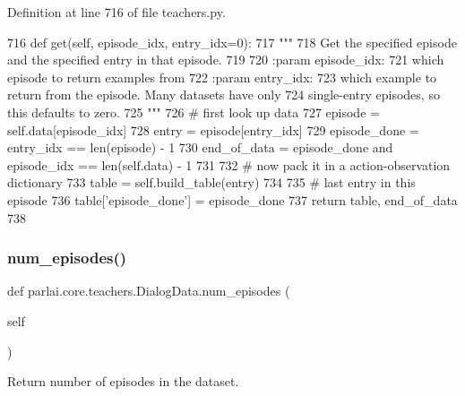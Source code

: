 Definition at line 716 of file teachers.\+py.


\begin{DoxyCode}
716     \textcolor{keyword}{def }get(self, episode\_idx, entry\_idx=0):
717         \textcolor{stringliteral}{"""}
718 \textcolor{stringliteral}{        Get the specified episode and the specified entry in that episode.}
719 \textcolor{stringliteral}{}
720 \textcolor{stringliteral}{        :param episode\_idx:}
721 \textcolor{stringliteral}{            which episode to return examples from}
722 \textcolor{stringliteral}{        :param entry\_idx:}
723 \textcolor{stringliteral}{            which example to return from the episode. Many datasets have only}
724 \textcolor{stringliteral}{            single-entry episodes, so this defaults to zero.}
725 \textcolor{stringliteral}{        """}
726         \textcolor{comment}{# first look up data}
727         episode = self.data[episode\_idx]
728         entry = episode[entry\_idx]
729         episode\_done = entry\_idx == len(episode) - 1
730         end\_of\_data = episode\_done \textcolor{keywordflow}{and} episode\_idx == len(self.data) - 1
731 
732         \textcolor{comment}{# now pack it in a action-observation dictionary}
733         table = self.build\_table(entry)
734 
735         \textcolor{comment}{# last entry in this episode}
736         table[\textcolor{stringliteral}{'episode\_done'}] = episode\_done
737         \textcolor{keywordflow}{return} table, end\_of\_data
738 
\end{DoxyCode}
\mbox{\label{classparlai_1_1core_1_1teachers_1_1DialogData_a83e3457f29a54ec455ad76f7eab6cfc4}} 
\subsubsection{\texorpdfstring{num\+\_\+episodes()}{num\_episodes()}}
{\footnotesize\ttfamily def parlai.\+core.\+teachers.\+Dialog\+Data.\+num\+\_\+episodes (\begin{DoxyParamCaption}\item[{}]{self }\end{DoxyParamCaption})}

\begin{DoxyVerb}Return number of episodes in the dataset.
\end{DoxyVerb}
 

